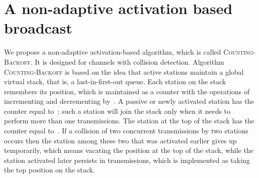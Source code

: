 \documentclass[11pt]{article}
\begin{document}
\section{A non-adaptive activation based broadcast}

\label{sec:non-adaptive-activation-based}





We propose a non-adaptive activation-based algorithm, which is called \textsc{Counting-Backoff}.
It is designed for channels with collision detection.
Algorithm \textsc{Counting-Backoff} is based on the idea that active stations maintain a global virtual stack, that is, a last-in-first-out queue.
Each station on the stack remembers its position, which is maintained as a counter with the operations of incrementing and decrementing by~.
A passive or newly activated station has the counter equal to~; such a station will join the stack only when it needs to perform more than one transmissions.
The station at the top of the stack has the counter equal to~.
If a collision of two concurrent transmissions by two stations occurs then the station among these two that was activated earlier gives up temporarily, which means vacating the position at the top of the stack, while the station activated later persists in transmissions, which is implemented as  taking the top position on the stack.
\end{document}
